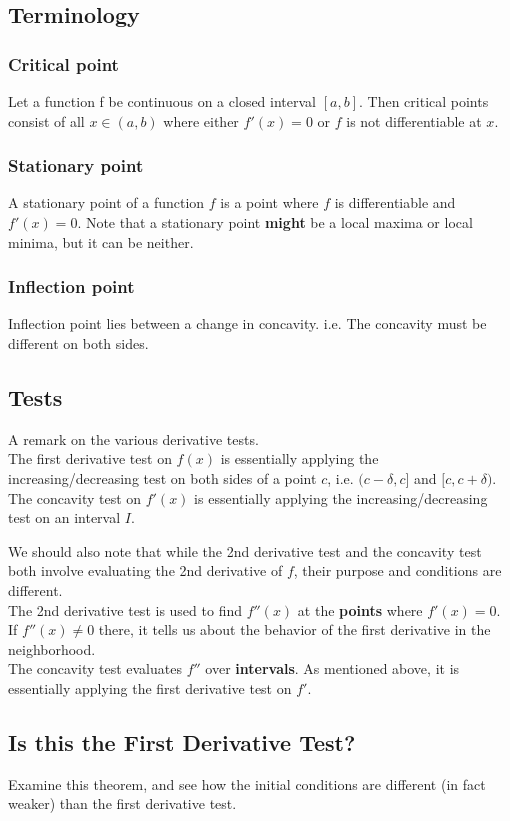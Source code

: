 \documentclass{article}
\begin{document}
\subsection{Terminology}
\subsubsection{Critical point}
Let a function f be continuous on a closed interval $[a,b]$. Then critical points consist of all $x\in (a,b)$ where either $f'(x)=0$ or $f$ is not differentiable at $x$.
\subsubsection{Stationary point}
A stationary point of a function $f$ is a point where $f$ is differentiable and $f'(x)=0$. Note that a stationary point \textbf{might} be a local maxima or local minima, but it can be neither.

\subsubsection{Inflection point}
Inflection point lies between a change in concavity. i.e. The concavity must be different on both sides.

\subsection{Tests}
A remark on the various derivative tests.\\
The first derivative test on $f(x)$ is essentially applying the increasing/decreasing test on both sides of a point $c$, i.e. $(c-\delta,c]$ and $[c, c+\delta)$.\\
The concavity test on $f'(x)$ is essentially applying the increasing/decreasing test on an interval $I$.

We should also note that while the 2nd derivative test and the concavity test both involve evaluating the 2nd derivative of $f$, their purpose and conditions are different.\\
The 2nd derivative test is used to find $f''(x)$ at the \textbf{points} where $f'(x)=0$. If $f''(x)\neq 0$ there, it tells us about the behavior of the first derivative in the neighborhood.\\
The concavity test evaluates $f''$ over \textbf{intervals}. As mentioned above, it is essentially applying the first derivative test on $f'$.

\subsection{Is this the First Derivative Test?}
Examine this theorem, and see how the initial conditions are different (in fact weaker) than the first derivative test.
\end{document}
